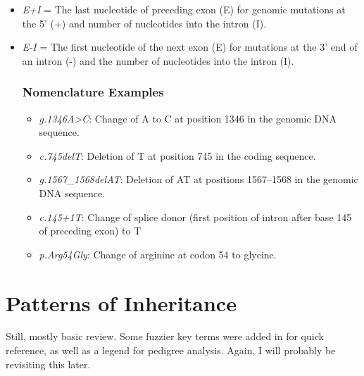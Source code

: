 \documentclass{inVerba-notes}
\begin{document}
  \begin{itemize}
    \item \emph{E+I} = The last nucleotide of preceding exon (E) for genomic mutations at the 5' (+) and number of nucleotides into the intron (I).
    \item \emph{E-I} = The first nucleotide of the next exon (E) for mutations at the 3' end of an intron (-) and the number of nucleotides into the intron (I).
  \subsection{Nomenclature Examples}
  \begin{itemize}
      \item \emph{g.1346A>C}: Change of A to C at position 1346 in the genomic DNA sequence.
      \item \emph{c.745delT}: Deletion of T at position 745 in the coding sequence.
      \item \emph{g.1567\_1568delAT}: Deletion of AT at positions 1567--1568 in the genomic DNA sequence.
      \item \emph{c.145+1T}: Change of splice donor (first position of intron after base 145 of preceding exon) to T
      \item \emph{p.Arg54Gly}: Change of arginine at codon 54 to glycine.
  \end{itemize}
\end{itemize}

\chapter{Patterns of Inheritance}\label{Patterns of Inheritance}
\begin{adjustwidth}{1cm}{1cm}
  Still, mostly basic review. Some fuzzier key terms were added in for quick reference, as well as a legend for pedigree analysis. Again, I will probably be revisiting this later.
\end{adjustwidth}
\end{document}
